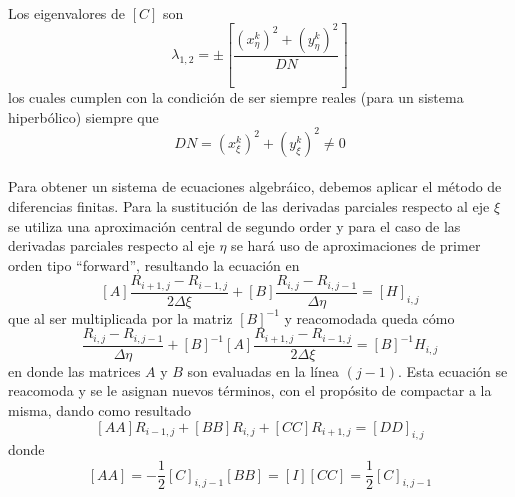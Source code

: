 \documentclass[letterpaper, openright, 12pt]{book}
\begin{document}
		\paragraph*{}
			Los eigenvalores de $\left[ C \right]$ son
			\begin{equation*}
				\lambda_{1, 2} = \pm \left[ \frac{\left(x_{\eta}^{k} \right)^2 + \left( y_{\eta}^{k} \right)^2} {DN} \right]
			\end{equation*}
			los cuales cumplen con la condición de ser siempre reales (para un sistema hiperbólico) siempre que
			\begin{equation*}
			DN = \left( x_{\xi}^{k} \right)^2 + \left( y_{\xi}^{k} \right)^2 \neq 0
			\end{equation*}
		 \paragraph*{}
			 Para obtener un sistema de ecuaciones algebráico, debemos aplicar el método de diferencias finitas. Para la sustitución de las derivadas parciales respecto al eje $\xi$ se utiliza una aproximación central de segundo order y para el caso de las derivadas parciales respecto al eje $\eta$ se hará uso de aproximaciones de primer orden tipo ``forward'', resultando la ecuación en
			 \begin{equation}
				 \left[ A \right] \frac{R_{i + 1, j} - R_{i - 1, j}}{2 \Delta \xi} + \left[ B \right] \frac{R_{i, j} - R_{i, j - 1}}{\Delta \eta} = \left[ H \right]_{i, j}
			 \end{equation}
			 que al ser multiplicada por la matriz $\left[ B \right]^{-1}$ y reacomodada queda cómo
			 \begin{equation}
				 \frac{R_{i, j} - R_{i, j-1} }{\Delta \eta} + \left[ B \right]^{-1} \left[ A \right] \frac{R_{i + 1, j} - R_{i - 1, j} }{2 \Delta \xi} = \left[ B \right]^{-1} H_{i, j}
			 \end{equation}
			 en donde las matrices $A$ y $B$ son evaluadas en la línea $(j - 1)$. Esta ecuación se reacomoda y se le asignan nuevos términos, con el propósito de compactar a la misma, dando como resultado
			 \begin{equation}
				 \left[ AA \right] R_{i - 1, j} + \left[ BB \right] R_{i, j} + \left[ CC \right] R_{i + 1, j} = \left[ DD \right]_{i, j}
				 \label{ec-hyper-final}
			 \end{equation}
			 donde
			 \begin{subequations}
			 	\begin{equation*}
				 	\left[ AA \right] = - \frac{1}{2} \left[ C \right]_{i, j - 1}
			 	\end{equation*}
				\begin{equation*}
					\left[ BB \right] = \left[ I \right]
				\end{equation*}
				\begin{equation*}
					\left[ CC \right] = \frac{1}{2} \left[ C \right]_{i, j - 1}
				\end{equation*} 
			 \end{subequations}
\end{document}
